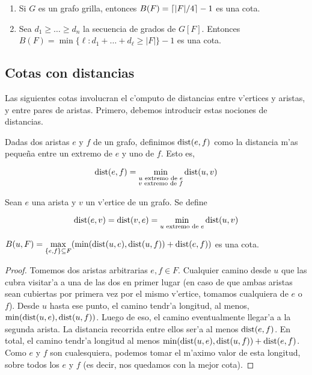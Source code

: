\begin{corollary}
\hfill
\begin{enumerate}
\item Si $G$ es un grafo grilla, entonces $B(F) = \left\lceil |F|/4 \right\rceil - 1$ es una cota.
\item Sea $d_1 \geq \dots \geq d_n$ la secuencia de grados de $G[F]$. Entonces $B(F) = \min\{\ell : d_1 + \dots + d_{\ell} \geq |F|\} - 1$ es una cota.
\end{enumerate}
\end{corollary}

\subsection{Cotas con distancias}

Las siguientes cotas involucran el c'omputo de distancias entre v'ertices y aristas, y entre pares de aristas. Primero, debemos introducir estas nociones de distancias.

\begin{definition}
\label{de:dist_aristas}
Dadas dos aristas $e$ y $f$ de un grafo, definimos $\textnormal{dist}(e, f)$ como la distancia m'as peque\~na entre un extremo de $e$ y uno de $f$. Esto es,

\[\textnormal{dist}(e, f) = \min\limits_{\substack{u \text{ extremo de }e \\ v \text{ extremo de }f}} \textnormal{dist}(u, v)\]
\end{definition}

\begin{definition}
Sean $e$ una arista y $v$ un v'ertice de un grafo. Se define

\[\textnormal{dist}(e, v) = \textnormal{dist}(v, e) = \min\limits_{u \text{ extremo de }e} \textnormal{dist}(u, v)\]
\end{definition}

\begin{theorem}
\label{th:cota_dist_x2}
$B(u, F) = \max\limits_{\{e, f\} \subseteq F} (\min(\textnormal{dist}(u, e), \textnormal{dist}(u, f)) + \textnormal{dist}(e, f))$ es una cota.

\begin{proof}
Tomemos dos aristas arbitrarias $e, f \in F$. Cualquier camino desde $u$ que las cubra visitar'a a una de las dos en primer lugar (en caso de que ambas aristas sean cubiertas por primera vez por el mismo v'ertice, tomamos cualquiera de $e$ o $f$). Desde $u$ hasta ese punto, el camino tendr'a longitud, al menos, $\min(\textnormal{dist}(u,e), \textnormal{dist}(u, f))$. Luego de eso, el camino eventualmente llegar'a a la segunda arista. La distancia recorrida entre ellos ser'a al menos $\textnormal{dist}(e, f)$. En total, el camino tendr'a longitud al menos $\min(\textnormal{dist}(u,e), \textnormal{dist}(u, f)) + \textnormal{dist}(e, f)$. Como $e$ y $f$ son cualesquiera, podemos tomar el m'aximo valor de esta longitud, sobre todos los $e$ y $f$ (es decir, nos quedamos con la mejor cota).
\end{proof}
\end{theorem}

